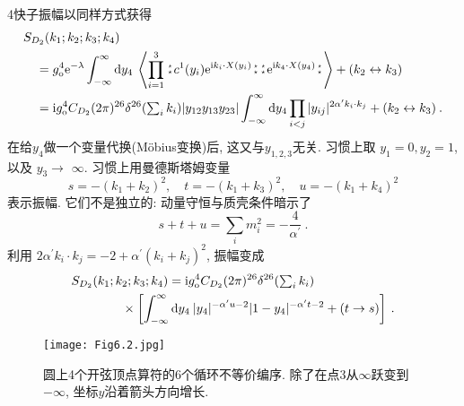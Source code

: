 4快子振幅以同样方式获得
\begin{align}
&S_{D_{2}}(k_{1} ; k_{2} ; k_{3} ; k_{4}) \nonumber \\
&\quad =g_{\mathrm{o}}^{4} \me^{-\lambda} \int_{-\infty}^{\infty} \dif y_{4}\:
\left\langle\prod_{i=1}^{3} \bno c^{1}(y_{i}) \me^{\mi k_{i} \cdot X(y_{i})}\bno 
\bno \me^{\mi k_{4} \cdot X(y_{4})}\bno \right\rangle +(k_{2} \leftrightarrow k_{3}) \nonumber \\
&\quad =\mi g_{\mathrm{o}}^{4} C_{D_{2}}(2 \pi)^{26} \delta^{26}({\textstyle\sum_{i} k_{i}})|y_{12} y_{13} y_{23}| 
\int_{-\infty}^{\infty} \dif y_{4} \prod_{i<j}|y_{i j}|^{2 \alpha^{\prime} k_{i} \cdot k_{j}} +(k_{2} \leftrightarrow k_{3}) \:. \label{6.4.5}
\end{align}
在给$y_{4} $做一个变量代换(M\"{o}bius变换)后, 这又与$y_{1,2,3}$无关. 习惯上取 $y_{1}=0, y_{2}=1$, 以及 $y_{3} \rightarrow$ $\infty$. 
习惯上用曼德斯塔姆变量
\begin{equation}
	s=-(k_{1}+k_{2})^{2}, \quad t=-(k_{1}+k_{3})^{2}, \quad u=-(k_{1}+k_{4})^{2} \label{6.4.6}
\end{equation}
表示振幅. 它们不是独立的: 动量守恒与质壳条件暗示了
\begin{equation}
	s+t+u=\sum_{i} m_{i}^{2}=-\frac{4}{\alpha^{\prime}} \:. \label{6.4.7}
\end{equation}
\newpage
\noindent 利用 $2 \alpha^{\prime} k_{i} \cdot k_{j}=-2+\alpha^{\prime}(k_{i}+k_{j})^{2}$, 振幅变成
	\begin{align}
		&S_{D_{2}}(k_{1} ; k_{2}; k_{3} ; k_{4}) = \mathrm{i}  g_{\mathrm{o}}^{4} C_{D_{2}}(2 \pi)^{26} \delta^{26}({\textstyle\sum_{i} k_{i}})
		\nonumber \\
		&\qquad \qquad \times\left[\int_{-\infty}^{\infty} \mathrm{d} y_{4}\: |y_{4}|^{-\alpha^{\prime} u-2}|1-y_{4}|^{-\alpha^{\prime} t-2}
		+(t \rightarrow s)\right] \:. \label{6.4.8}
	\end{align}


\begin{figure}[h]
	\begin{center}
		\texttt{[image: Fig6.2.jpg]}\\
		\caption{圆上4个开弦顶点算符的6个循环不等价编序. 除了在点3从$\infty$跃变到$-\infty$, 坐标$y$沿着箭头方向增长.}\label{fig:6.2}
	\end{center}
\end{figure}
	

